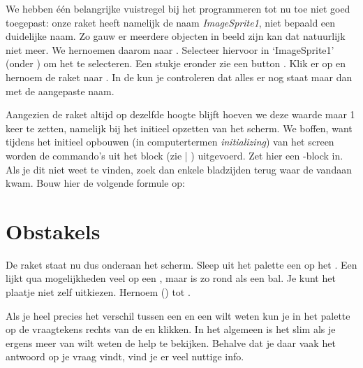 We hebben \'e\'en belangrijke vuistregel bij het programmeren tot nu toe niet goed toegepast: onze raket heeft namelijk de naam \emph{ImageSprite1}, niet bepaald een duidelijke naam. Zo gauw er meerdere objecten in beeld zijn kan dat natuurlijk niet meer. We hernoemen daarom  naar . Selecteer hiervoor in \ai `ImageSprite1' (onder ) om het te selecteren. Een stukje eronder zie een button . Klik er op en hernoem de raket naar . In de  kun je controleren dat alles er nog staat maar dan met de aangepaste naam. 

Aangezien de raket altijd op dezelfde hoogte blijft hoeven we deze waarde maar 1 keer te zetten, namelijk bij het initieel opzetten van het scherm. We boffen, want tijdens het initieel opbouwen (in computertermen \emph{initializing}) van het screen worden de commando's uit het block  (zie  | ) uitgevoerd. Zet hier een 
\linebreak {}-block in. Als je dit niet weet te vinden, zoek dan enkele bladzijden terug waar de 
\linebreak {} vandaan kwam. 
Bouw hier de volgende formule op:

\runOpTelefoon{} 

\section{Obstakels}

De raket staat nu dus onderaan het scherm. Sleep uit het palette  een  op het . Een  lijkt qua mogelijkheden veel op een 
\linebreak {}, maar is zo rond als een bal. 
Je kunt het plaatje niet zelf uitkiezen. Hernoem ()  tot .

Als je heel precies het verschil tussen een  en een  wilt weten kun je in het palette op de vraagtekens rechts van de  en  klikken.
In het algemeen is het slim als je ergens meer van wilt weten de help te bekijken. Behalve dat je daar vaak het antwoord op je vraag vindt, vind je er veel nuttige info. 


